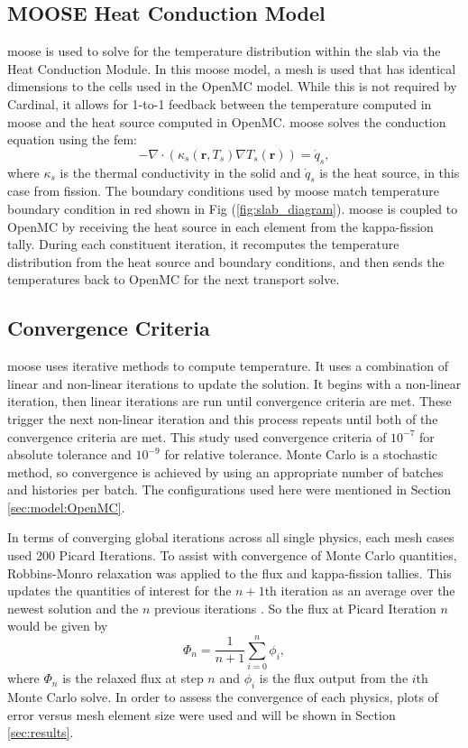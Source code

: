 \documentclass[letterpaper]{mc2023}
\begin{document}
\subsection{MOOSE Heat Conduction Model}
\gls{moose} is used to solve for the temperature distribution within the slab via the Heat Conduction Module. In this \gls{moose}
model, a mesh is used that has identical dimensions to the cells used in the OpenMC model. While this is not required by Cardinal,
it allows for 1-to-1 feedback between the temperature computed in \gls{moose} and the heat source computed in OpenMC. \gls{moose}
solves the conduction equation using the \gls{fem}:
\begin{equation}\label{eq:conduction}
    - \nabla \cdot (\kappa_{s}(\mathbf{r},T_{s}) \nabla T_{s}(\mathbf{r})) = \dot{q}_{s},
\end{equation}
where $\kappa_{s}$ is the thermal conductivity in the solid and $\dot{q}_{s}$ is the heat source, in this case from fission. The
boundary conditions used by \gls{moose} match temperature boundary condition in red shown in Fig (\ref{fig:slab_diagram}). \gls{moose}
is coupled to OpenMC by receiving the heat source in each element from the kappa-fission tally. During each constituent iteration,
it recomputes the temperature distribution from the heat source and boundary conditions, and then sends the temperatures back to
OpenMC for the next transport solve.

\subsection{Convergence Criteria}
\gls{moose} uses iterative methods to compute temperature. It uses a combination of linear and non-linear iterations to update the
solution. It begins with a non-linear iteration, then linear iterations are run until convergence criteria are met. These trigger the
next non-linear iteration and this process repeats until both of the convergence criteria are met. This study used convergence criteria
of $10^{-7}$ for absolute tolerance and $10^{-9}$ for relative tolerance. Monte Carlo is a stochastic method, so convergence is achieved
by using an appropriate number of batches and histories per batch. The configurations used here were mentioned in Section
\ref{sec:model:OpenMC}.

In terms of converging global iterations across all single physics, each mesh cases used 200 Picard Iterations. To assist with
convergence of Monte Carlo quantities, Robbins-Monro relaxation was applied to the flux and kappa-fission tallies. This updates the
quantities of interest for the $n+1$th iteration as an average over the newest solution and the $n$ previous iterations \cite{dufek}.
So the flux at Picard Iteration $n$ would be given by
\begin{equation}\label{eq:Robbins-Monro}
    \Phi_{n} = \frac{1}{n+1} \sum_{i=0}^{n} \phi_{i},
\end{equation}
where $\Phi_{n}$ is the relaxed flux at step $n$ and $\phi_{i}$ is the flux output from the $i$th Monte Carlo solve. In order to
assess the convergence of each physics, plots of error versus mesh element size were used and will be shown in Section \ref{sec:results}.
\end{document}
